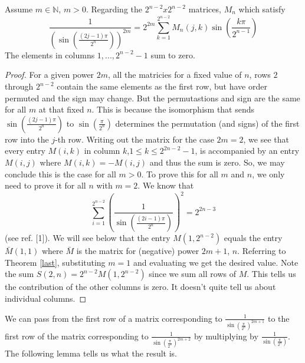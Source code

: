 \documentclass[fleqn,a4paper,9pt]{article}
\begin{document}
\begin{flushleft}
\begin{lemma}
Assume $m\in\mathbb{N}$, $m>0$. Regarding the $2^{n-2}x2^{n-2}$ matrices, $M_n$ which satisfy $$\frac{1}{(\sin(\frac{(2j-1)\pi}{2^n}))^{2m}}=2^{2m} \sum_{k=1}^{2^{n-2}}M_n(j,k)\sin(\frac{k\pi}{2^{n-1}})$$
The elements in columns $1,...,2^{n-2}-1$ sum to zero.
\end{lemma}
\begin{proof}
For a given power $2m$, all the matricies for a fixed value of $n$, rows $2$ through $2^{n-2}$ contain the same elements as the first row, but have order permuted and the sign may change. But the permutastions and sign are the same for all $m$ at that fixed $n$. This is because the isomorphism that sends $\sin(\frac{(2j-1)\pi}{2^n})$ to $\sin(\frac{\pi}{2^n})$ determines the permutation (and signs) of the first row into the $j$-th row. Writing out the matrix for the case $2m=2$, we see that every entry $M(i,k)$ in column $k$,$1\le k\le 2^{2n-2}-1$, is accompanied by an entry $M(i,j)$ where $M(i,k)=-M(i,j)$ and thus the sum is zero. So, we may conclude this is the case for all $m>0$. To prove this for all $m$ and $n$, we only need to prove it for all $n$ with $m=2$. We know that
$$\sum_{i=1}^{2^{n-2}}\left(\frac{1}{  \sin\left(\frac{\left(2 i-1\right)\pi}{2^n}\right)   }\right)^2=2^{2n-3}$$ (see ref. [1]). We will see below  that the entry $M(1,2^{n-2})$ equals the entry $\bar M(1,1)$ where $\bar{M}$ is the matrix for (negative) power $2m+1$, $n$. Referring to Theorem \ref{last}, substituting $m=1$ and evaluating we get the desired value. Note the sum $S(2,n)=2^{n-2}M(1,2^{n-2})$ since we sum all rows of $M$. This tells us the contribution of the other columns is zero. It doesn't quite tell us about individual columns.
\end{proof}
We can pass from the first row of a matrix corresponding to $\frac{1}{\sin\left(\frac{\pi}{2^{n}}\right)^{2m+1} }$ to the first row of the matrix corresponding to $\frac{1}{\sin\left(\frac{\pi}{2^{n}}\right)^{2m+2} }$ by multiplying by $\frac{1}{\sin\left(\frac{\pi}{2^{n}}\right) }$. The following lemma tells us what the result is.


\end{flushleft}
\end{document}
